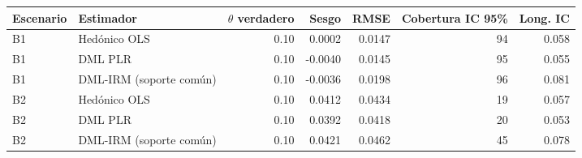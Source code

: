 \begin{tabular}{llrrrrr}
\toprule
Escenario & Estimador & $\theta$ verdadero & Sesgo & RMSE & Cobertura IC 95\% & Long. IC \\
\midrule
B1 & Hedónico OLS & 0.10 & 0.0002 & 0.0147 & 94 & 0.058 \\
B1 & DML PLR & 0.10 & -0.0040 & 0.0145 & 95 & 0.055 \\
B1 & DML-IRM (soporte común) & 0.10 & -0.0036 & 0.0198 & 96 & 0.081 \\
B2 & Hedónico OLS & 0.10 & 0.0412 & 0.0434 & 19 & 0.057 \\
B2 & DML PLR & 0.10 & 0.0392 & 0.0418 & 20 & 0.053 \\
B2 & DML-IRM (soporte común) & 0.10 & 0.0421 & 0.0462 & 45 & 0.078 \\
\bottomrule
\end{tabular}